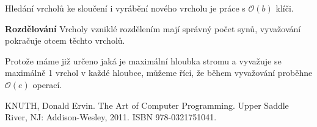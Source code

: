 \documentclass[a4paper,11pt,openany]{article}
\begin{document}
Hledání vrcholů ke sloučení i vyrábění nového vrcholu je práce s $ \mathcal{O}(b) $ klíči.

\textbf{Rozdělování} Vrcholy vzniklé rozdělením mají správný počet synů, vyvažování pokračuje otcem těchto vrcholů.

Protože máme již určeno jaká je maximální hloubka stromu a vyvažuje se maximálně 1 vrchol v každé hloubce, můžeme říci, že během vyvažování proběhne $ \mathcal{O}(e) $ operací.

\listoffigures
\begin{thebibliography}{10}
	KNUTH, Donald Ervin. The Art of Computer Programming. Upper Saddle River, NJ: Addison-Wesley, 2011. ISBN 978-0321751041.
\end{thebibliography}
\end{document}

